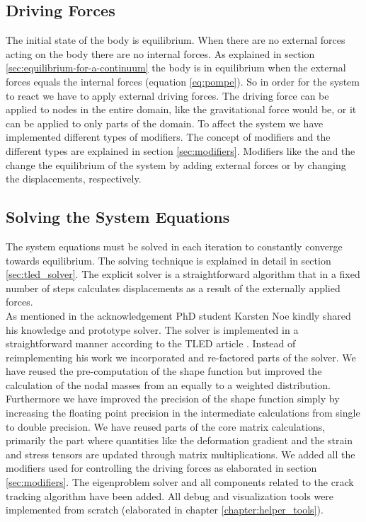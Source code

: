 \subsection*{Driving Forces}
The initial state of the body is equilibrium. When there are no
external forces acting on the body there are no internal forces. As
explained in section \vref{sec:equilibrium-for-a-continuum} the body
is in equilibrium 
when the external forces equals the internal forces (equation
\ref{eq:pompe}). So in order for the system to react we have to apply
external driving forces. The driving force can be applied to nodes in the
entire domain, like the gravitational force would be, or it can be
applied to only parts of the domain. To affect the system we have
implemented different types of modifiers. The concept of modifiers and
the different types are explained in section
\vref{sec:modifiers}. Modifiers like the  and the  change the
equilibrium of the system by adding external forces or by changing the
displacements, respectively.

\subsection*{Solving the System Equations}
The system equations must be solved in each iteration to constantly
converge towards equilibrium. The solving technique is explained in detail
in section \vref{sec:tled_solver}. The explicit solver
is a straightforward algorithm that in a fixed
number of steps calculates displacements as a result of the externally
applied forces. \\
%

As mentioned in the acknowledgement PhD student Karsten Noe
kindly shared his knowledge and prototype solver. The solver is
implemented in a straightforward manner according to the 
TLED article . Instead of reimplementing his work
we incorporated and re-factored parts of the solver. We have
reused the pre-computation of the shape function but improved the
calculation of the nodal masses from an equally to a weighted
distribution. Furthermore we have improved the precision of the shape
function simply by increasing the floating point precision in the
intermediate calculations from single to double precision. We have
reused parts of the core matrix calculations, primarily the part where
quantities like the deformation gradient and the strain and stress
tensors are updated through matrix multiplications. We added all the
modifiers used for controlling the driving forces as elaborated in section
\vref{sec:modifiers}. The eigenproblem solver and all components
related to the crack tracking algorithm have been added. All debug and
visualization tools were implemented from scratch (elaborated in
chapter \vref{chapter:helper_tools}). 


